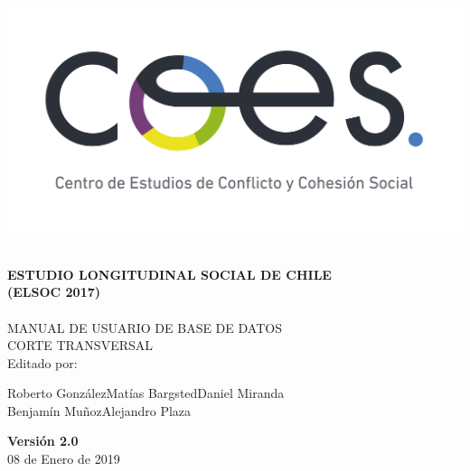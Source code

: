\begin{titlepage}
	\centering
	\includegraphics[width=16cm]{coes_blanco_esp.jpg}

\HRule{1.4pt} \\
\LARGE \textbf{\uppercase{Estudio Longitudinal Social de Chile}}\\
\LARGE \textbf{\uppercase{(ELSOC 2017)}}\\

\HRule{1.4pt} \\ [0.2cm]

\normalsize  \vspace*{0.2\baselineskip}
 \large \textsc{MANUAL DE USUARIO DE BASE DE DATOS\\ 	CORTE TRANSVERSAL}
\\ [0.2cm]
\vspace*{0.9cm}
Editado por:\\
\begin{center}
Roberto González\hspace*{1.25cm}Matías Bargsted\hspace*{1.25cm}Daniel Miranda\\
Benjamín Muñoz\hspace*{1.5cm}Alejandro Plaza\\
\end{center}
\vspace*{1.3cm}
\textbf{Versión 2.0}\\
08 de Enero de  2019\\
\end{titlepage}

\newpage

\thispagestyle{empty}
\begin{minipage}[b]{1\linewidth}
    \tableofcontents
\end{minipage}

\begin{minipage}[b]{1\linewidth}
    \listoftables
\end{minipage}

\begin{minipage}[b]{1\linewidth}
    \listoffigures
\end{minipage}

